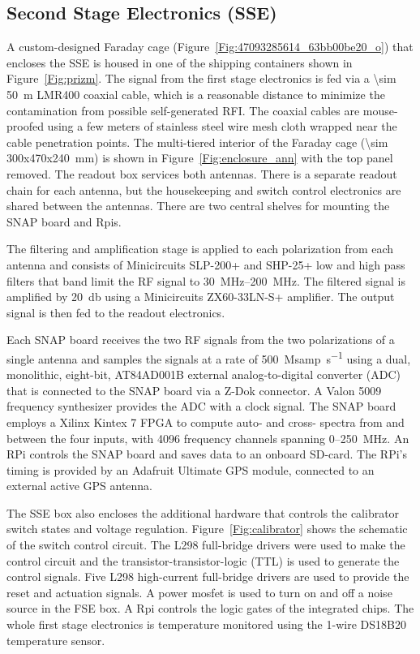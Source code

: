 \subsection{Second Stage Electronics (SSE)}

A custom-designed Faraday cage (Figure~\ref{Fig:47093285614_63bb00be20_o}) that encloses the SSE is housed in one of the shipping containers shown in Figure~\ref{Fig:prizm}. The signal from the first stage electronics is fed via a \SI{\sim 50}{\meter} LMR400 coaxial cable, which is a reasonable distance to minimize the contamination from possible self-generated RFI. The coaxial cables are mouse-proofed using a few meters of stainless steel wire mesh cloth wrapped near the cable penetration points. The multi-tiered interior of the Faraday cage (\SI{\sim 300x470x240}{\milli \meter}) is shown in Figure~\ref{Fig:enclosure_ann} with the top panel removed. The readout box services both antennas. There is a separate readout chain for each antenna, but the housekeeping and switch control electronics are shared between the antennas. There are two central shelves for mounting the SNAP board and Rpis. 

The filtering and amplification stage is applied to each polarization from each antenna and consists of Minicircuits SLP-200+ and SHP-25+ low and high pass filters that band limit the RF signal to \SIrange{30}{200}{\mega \hertz}. The filtered signal is amplified by \SI{20}{\decibel} using a Minicircuits ZX60-33LN-S+ amplifier. The output signal is then fed to the readout electronics.

Each SNAP board receives the two RF signals from the two polarizations of a single antenna and samples the signals at a rate of \SI{500}{\mega samp\per \second} using a dual, monolithic, eight-bit, AT84AD001B external analog-to-digital converter (ADC) that is connected to the SNAP board via a Z-Dok connector. A Valon 5009 frequency synthesizer provides the ADC with a clock signal. The SNAP board employs a Xilinx Kintex 7 FPGA to compute auto- and cross- spectra from and between the four inputs, with 4096 frequency channels spanning 0--250~MHz. An RPi controls the SNAP board and saves data to an onboard SD-card. The RPi's timing is provided by an Adafruit Ultimate GPS module, connected to an external active GPS antenna.

The SSE box also encloses the additional hardware that controls the calibrator switch states and voltage regulation. Figure~\ref{Fig:calibrator} shows the schematic of the switch control circuit. The L298 full-bridge drivers were used to make the control circuit and the transistor-transistor-logic (TTL) is used to generate the control signals. Five L298 high-current full-bridge drivers are used to provide the reset and actuation signals. A power mosfet is used to turn on and off a noise source in the FSE box. A Rpi controls the logic gates of the integrated chips. The whole first stage electronics is temperature monitored using the 1-wire DS18B20 temperature sensor.

